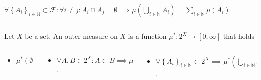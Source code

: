 \begin{frame}
\begin{definition}[Measure]
\begin{columns}
\begin{column}{0.78\textwidth}
\begin{itemize}
					      \begin{math}
						      \forall
						      {\left\{A_{i}\right\}}_{i\in\mathds{N}}\subset
						      \mathcal{F}:
						      \forall i\neq j:
						      A_{i}\cap A_{j}=\emptyset\implies
						      \mu\left(
						      \bigcup\limits_{i\in\mathds{N}}A_{i}
						      \right)=
						      \sum\limits_{i\in\mathds{N}}\mu\left(A_{i}\right)
					      \end{math}.
				\end{itemize}
			\end{column}
		\end{columns}
	\end{definition}

	\begin{definition}
		Let $X$ be a set.
		An \alert{outer measure} on $X$ is a function
		\begin{math}
			\mu^{\ast}\colon 2^{X}\to\left[0,\infty\right]
		\end{math}
		that holds
		\begin{columns}
			\begin{column}{0.13\textwidth}
				\begin{itemize}
					\item

					      \begin{math}
						      \mu^{\ast}\left(\emptyset\right)=
						      0.
					      \end{math}
				\end{itemize}

			\end{column}
			\begin{column}{0.43\textwidth}
				\begin{itemize}
					\item

					      \begin{math}
						      \forall A,B\in 2^{X}:
						      A\subset B\implies
						      \mu^{\ast}\left(A\right)\leq
						      \mu^{\ast}\left(B\right)
					      \end{math}.
				\end{itemize}
			\end{column}
			\begin{column}{0.48\textwidth}
				\begin{itemize}
					\item

					      \begin{math}
						      \forall
						      \left\{A_{i}\right\}_{i\in\mathds{N}}\subset
						      2^{X}\implies
						      \mu^{\ast}
						      \left(\bigcup\limits_{i\in\mathds{N}}A_{i}\right)=
						      \sum\limits_{i\in\mathds{N}}\mu^{\ast}
						      \left(A_{i}\right)
					      \end{math}.
				\end{itemize}
			\end{column}
		\end{columns}
	\end{definition}

\end{frame}

